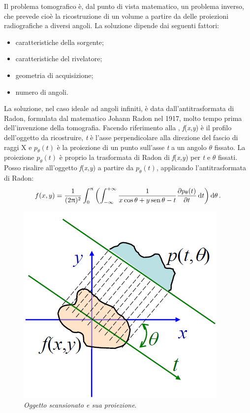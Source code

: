 Il problema tomografico è, dal punto di vista matematico, un problema inverso, che prevede cioè la ricostruzione di un volume a partire da delle proiezioni radiografiche a diversi angoli. La soluzione dipende dai seguenti fattori:
\begin{itemize}[label=$-$]
    \item caratteristiche della sorgente;
    \item caratteristiche del rivelatore;
    \item geometria di acquisizione;
    \item numero di angoli.
\end{itemize}
La soluzione, nel caso ideale ad angoli infiniti, è data dall'antitrasformata di Radon, formulata dal matematico Johann Radon nel 1917, molto tempo prima dell'invenzione della tomografia. Facendo riferimento alla , \textit{f}(\textit{x,y}) è il profilo dell'oggetto da ricostruire, \textit{t} è l'asse perpendicolare alla direzione del fascio di raggi X e $p_\theta(t)$ è la proiezione di un punto sull'asse \textit{t} a un angolo $\theta$ fissato. La proiezione $p_\theta(t)$ è proprio la trasformata di Radon di \textit{f}(\textit{x,y}) per \textit{t} e $\theta$ fissati. Posso risalire all'oggetto \textit{f}(\textit{x,y}) a partire da $p_\theta(t)$, applicando l'antitrasformata di Radon:
\begin{equation}\label{radon}
    f(x,y) = \frac{1}{(2\uppi)^2} \int_0^\uppi \left( \int_{-\infty}^{+\infty} \frac{1}{x\cos{\theta}+y\operatorname{sen}{\theta}-t} \frac{\partial p_\theta(t)}{\partial t}\, \mathrm{d}t \right) \mathrm{d}\theta \,.
\end{equation}

\begin{figure}[htp]
\centering
\includegraphics[scale=0.75]{Immagini/radon.png}
\caption{\label{fig:radon} \textit{Oggetto scansionato e sua proiezione}.}
\end{figure}

